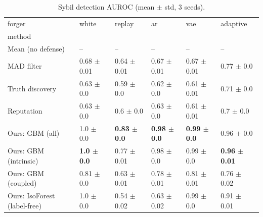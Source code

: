 \begin{table}
\caption{Sybil detection AUROC (mean $\pm$ std, 3 seeds).}
\label{tab:auroc}
\begin{tabular}{llllll}
\toprule
forger & white & replay & ar & vae & adaptive \\
method &  &  &  &  &  \\
\midrule
Mean (no defense) & -- & -- & -- & -- & -- \\
MAD filter & 0.68 $\pm$ 0.01 & 0.64 $\pm$ 0.01 & 0.67 $\pm$ 0.01 & 0.67 $\pm$ 0.01 & 0.77 $\pm$ 0.0 \\
Truth discovery & 0.63 $\pm$ 0.0 & 0.59 $\pm$ 0.0 & 0.62 $\pm$ 0.0 & 0.61 $\pm$ 0.01 & 0.71 $\pm$ 0.0 \\
Reputation & 0.63 $\pm$ 0.0 & 0.6 $\pm$ 0.0 & 0.63 $\pm$ 0.0 & 0.61 $\pm$ 0.01 & 0.7 $\pm$ 0.0 \\
Ours: GBM (all) & 1.0 $\pm$ 0.0 & \textbf{0.83 $\pm$ 0.0} & \textbf{0.98 $\pm$ 0.0} & \textbf{0.99 $\pm$ 0.0} & 0.96 $\pm$ 0.0 \\
Ours: GBM (intrinsic) & \textbf{1.0 $\pm$ 0.0} & 0.77 $\pm$ 0.01 & 0.98 $\pm$ 0.0 & 0.99 $\pm$ 0.0 & \textbf{0.96 $\pm$ 0.01} \\
Ours: GBM (coupled) & 0.81 $\pm$ 0.0 & 0.63 $\pm$ 0.01 & 0.78 $\pm$ 0.01 & 0.81 $\pm$ 0.01 & 0.76 $\pm$ 0.02 \\
Ours: IsoForest (label-free) & 1.0 $\pm$ 0.0 & 0.54 $\pm$ 0.02 & 0.63 $\pm$ 0.02 & 0.99 $\pm$ 0.0 & 0.91 $\pm$ 0.01 \\
\bottomrule
\end{tabular}
\end{table}
